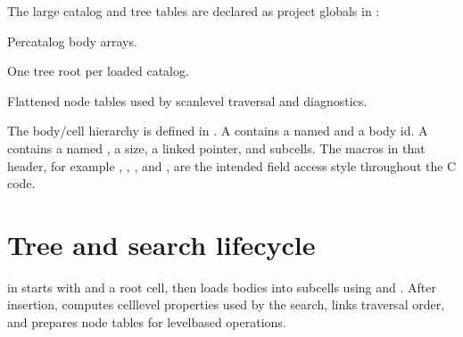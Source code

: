 \documentclass[letterpaper,10pt,english]{sphinxmanual}
\begin{document}
\sphinxAtStartPar
The large catalog and tree tables are declared as project globals in
:
\begin{description}
\sphinxAtStartPar
Per\sphinxhyphen{}catalog body arrays.

\sphinxAtStartPar
One tree root per loaded catalog.

\sphinxAtStartPar
Flattened node tables used by scan\sphinxhyphen{}level traversal and diagnostics.

\end{description}

\sphinxAtStartPar
The body/cell hierarchy is defined in . A 
contains a  named  and a body id. A  contains a
 named , a size, a linked  pointer, and 
subcells. The macros in that header, for example , ,
, and , are the intended field access style throughout
the C code.


\section{Tree and search lifecycle}
\label{\detokenize{code_structure:tree-and-search-lifecycle}}
\sphinxAtStartPar
{} in  starts with  and a root cell,
then loads bodies into subcells using  and . After
insertion,  computes cell\sphinxhyphen{}level properties used by the search,
 links traversal order, and  prepares node tables
for level\sphinxhyphen{}based operations.
\end{document}
